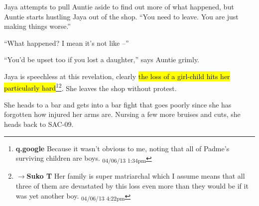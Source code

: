 Jaya attempts to pull Auntie aside to find out more of what happened, but Auntie starts hustling Jaya out of the shop.  ``You need to leave.  You are just making things worse.''

``What happened?  I mean it's not like --''

``You'd be upset too if you lost a daughter,'' says Auntie grimly.

Jaya is speechless at this revelation, clearly \hl{the loss of a girl-child hits her particularly hard}\footnote{\textbf{q.google }Because it wasn't obvious to me, noting that all of Padme's surviving children are boys. \textsubscript{04/06/13 1:34pm}}\footnote{$\rightarrow$\textbf{Suko T }Her family is super matriarchal which I assume means that all three of them are devastated by this loss even more than they would be if it was yet another boy. \textsubscript{04/06/13 4:22pm}}.  She leaves the shop without protest.



She heads to a bar and gets into a bar fight that goes poorly since she has forgotten how injured her arms are.  Nursing a few more bruises and cuts, she heads back to SAC-09.





